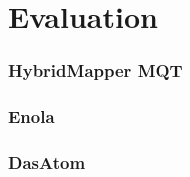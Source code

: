 
\chapter{Evaluation}\label{chapter:evaluation}
\parencite{Emil_Khusainov_Bachelor_GIT}
\subsection{HybridMapper \ac{MQT}}
\subsection{Enola}
\subsection{DasAtom}